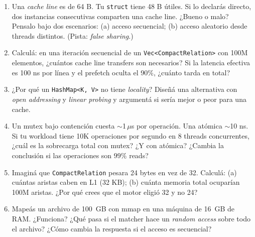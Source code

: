 \begin{ejercicios}
\begin{enumerate}
    \item \starred{} Una \emph{cache line} es de 64 B. Tu \texttt{struct}
    tiene 48 B útiles. Si lo declarás directo, dos instancias
    consecutivas comparten una cache line. ¿Bueno o malo? Pensalo
    bajo dos escenarios: (a) acceso secuencial; (b) acceso aleatorio
    desde threads distintos. (Pista: \emph{false sharing}.)

    \item Calculá: en una iteración secuencial de un
    \texttt{Vec<CompactRelation>} con 100M elementos, ¿cuántos cache
    line transfers son necesarios? Si la latencia efectiva es 100 ns
    por línea y el prefetch oculta el 90\%, ¿cuánto tarda en total?

    \item \starred{} ¿Por qué un \texttt{HashMap<K, V>} no tiene
    \emph{locality}? Diseñá una alternativa con
    \emph{open addressing} y \emph{linear probing} y argumentá si
    sería mejor o peor para una cache.

    \item Un mutex bajo contención cuesta $\sim$1\,$\mu$s por
    operación. Una atómica $\sim$10 ns. Si tu workload tiene 10K
    operaciones por segundo en 8 threads concurrentes, ¿cuál es la
    sobrecarga total con mutex? ¿Y con atómica? ¿Cambia la
    conclusión si las operaciones son \(99\%\) reads?

    \item Imaginá que \texttt{CompactRelation} pesara 24 bytes en vez
    de 32. Calculá: (a) cuántas aristas caben en L1 (32 KB); (b)
    cuánta memoria total ocuparían 100M aristas. ¿Por qué crees que
    el motor eligió 32 y no 24?

    \item Mapeás un archivo de 100~GB con mmap en una máquina de
    16~GB de RAM. ¿Funciona? ¿Qué pasa si el matcher hace un
    \emph{random access} sobre todo el archivo? ¿Cómo cambia la
    respuesta si el acceso es secuencial?
\end{enumerate}
\end{ejercicios}
